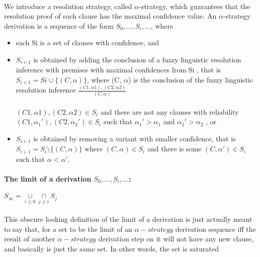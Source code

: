 \documentclass[part1.tex]{subfiles}
\begin{document}
\paragraph{} 
We introduce a resolution strategy, called $\alpha$-strategy, which guarantees that
the resolution proof of each clause has the maximal confidence
value. An $\alpha$-strategy
derivation is a sequence of the form $S_{0},\ldots,S_{i},\ldots$, where
\begin{itemize} 
	\item each Si is a set of clauses with confidence, and
	\item  \(S_{i+1}\) is obtained by adding the conclusion of a fuzzy 
	linguistic resolution inference with premises with
        maximal confidences 
	from Si , that is \(S_{i+1} = Si \cup \{(C, \alpha)\}\), 
	where (C, $\alpha$) is the conclusion of the fuzzy linguistic resolution inference  
	\(\frac{(C1 , \alpha1), (C2 , \alpha2)}	{(C, \alpha)}\)
	\\\\	
	$(C1 , \alpha1 ), (C2 , \alpha2 ) \in S_{i}$ and there are not any clauses 
	with reliability $(C1 , \alpha_{1}' ), (C2 , \alpha_{2}' ) \in S_{i}$ such that
			$\alpha_{1}' > \alpha_{1}$ and $\alpha_{2}' > \alpha_{2}$ , or

		\item $S_{i+1}$ is obtained by removing a variant with smaller 
			confidence, that is $S_{i+1} = S_{i} \setminus \{(C, \alpha)\}$ 
			where $(C, \alpha) \in S_{i}$ and there is some
			$(C, \alpha') \in S_{i}$ such that $\alpha < \alpha'$.
\end{itemize}
\paragraph{} 
\paragraph{The limit of a derivation $S_{0},\ldots,S_{i},\ldots$:} 
$S_{\infty} = \underset{i \ge 0}{\cup} \underset{j \ge i}{\cap}S_{j}$
\paragraph{} This obscure looking definition of the limit of a
derivation is just actually meant to say that, for a set to be the
limit of an $\alpha-strategy$ derivation sequence iff the result
of another $\alpha-strategy$ derivation step on it will not have
any new clause, and basically is just the same set. In other
words, the set is saturated
\end{document}
